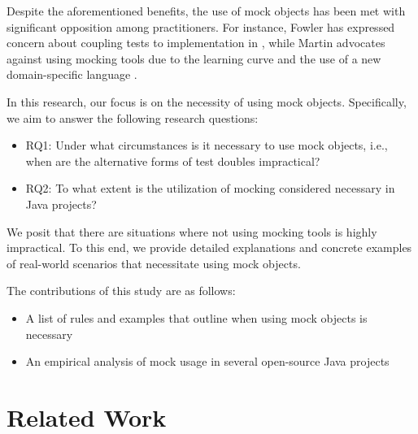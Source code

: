\documentclass[conference]{IEEEtran}
\begin{document}
Despite the aforementioned benefits, the use of mock objects has been met with significant opposition among practitioners. For instance, Fowler has expressed concern about coupling tests to implementation in \cite{mockarentstubs}, while Martin advocates against using mocking tools due to the learning curve and the use of a new domain-specific language \cite{whentomock}.

In this research, our focus is on the necessity of using mock objects. Specifically, we aim to answer the following research questions:

\begin{itemize}
    \item RQ1: Under what circumstances is it necessary to use mock objects, i.e., when are the alternative forms of test doubles impractical?
    \item RQ2: To what extent is the utilization of mocking considered necessary in Java projects?
\end{itemize}

We posit that there are situations where not using mocking tools is highly impractical. To this end, we provide detailed explanations and concrete examples of real-world scenarios that necessitate using mock objects.

The contributions of this study are as follows:

\begin{itemize}
    \item A list of rules and examples that outline when using mock objects is necessary
    \item An empirical analysis of mock usage in several open-source Java projects
\end{itemize}

\section{Related Work}


\end{document}

